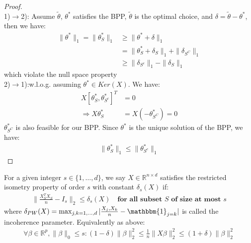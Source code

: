 \begin{proof}
\quad\\
1)$\rightarrow$2): Assume $\tilde{\theta}$, $\theta^*$ satisfies the BPP, $\tilde{\theta}$ is the optimal choice, and $\delta = \tilde{\theta} - \theta^*$, then we have:
\begin{align*}
	\|\theta^*\|_1 = \|\theta^*_S\|_1 &\geq  \|\theta^* + \delta\|_1\\
	&= \|\theta^*_S + \delta_S \|_1 + \|\delta_{S^C}\|_1\\
	&\geq \|\delta_{S^c}\|_1 - \|\delta_S\|_1
\end{align*}
which violate the null space property\\
2)$\rightarrow$1):w.l.o.g. assuming $\theta^* \in Ker(X)$. We have:
\begin{align*}
	X [\theta^*_S, \theta^*_{S^c}]^T &= 0\\
	\Rightarrow X \theta^*_S &= X(-\theta^*_{S^C}) = 0
\end{align*}  
$\theta^*_{S^C}$ is also feasible for our BPP. Since $\theta^*$ is the unique solution of the BPP, we have:
\begin{align*}
	\|\theta^*_S\|_1 \leq \|\theta^*_{S^c}\|_1
\end{align*}
\end{proof}

\begin{definition}
	For a given integer $s \in \{1, \dots, d\}$, we say $X \in \mathbb{R}^{n \times d}$ satisfies the restricted isometry property of order $s$ with constant $\delta_s(X)$ if:
	\begin{align*}
		\|\frac{X_S^T X_S}{n} - I_s\|_2 \leq \delta_s(X) \quad \textbf{for all subset $S$ of size at most $s$}
	\end{align*}
	where $\delta_{PW}(X) = \max_{j, k = 1, \dots, d} |\frac{X_j, X_k}{n} - \mathbbm{1}_{j = k}|$ is called the incoherence parameter. Equivalently as above:
	\begin{align*}
		\forall \beta \in \mathbb{R}^p, \|\beta\|_0 \leq s:(1-\delta)\|\beta\|^2_2 \leq \frac{1}{n} \|X\beta\|^2_2 \leq (1+\delta)\| \beta\|^2_2
	\end{align*}
\end{definition}


